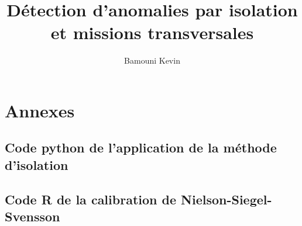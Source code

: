 \documentclass[12pt,a4paper]{report}
\author{Bamouni Kevin}
\title{Détection d'anomalies par isolation et missions transversales}
\begin{document}


\maketitle





\setcounter{page}{1} %







{\setlength{\baselineskip}{0.9\baselineskip}
\par}


\setcounter{page}{1} 









\chapter*{Annexes}

\section*{Code python de l'application de la méthode d'isolation}



\section*{Code R de la calibration de Nielson-Siegel-Svensson}



{\setlength{\baselineskip}{0.9\baselineskip}
\setcounter{tocdepth}{5} %
\tableofcontents %
\par}

\listoffigures

\listoftables



\cite{Liu2012}
\cite{Hull2015}
\cite{STORN1997}
\cite{Befec-PriceWaterhouse1996}
\cite{ManfredGilli2010}
\\
\end{document}
